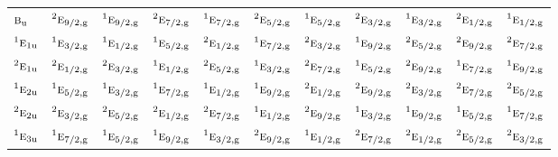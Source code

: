 \documentclass[10pt,a4paper]{article}
\numberwithin{equation}{section}
\newcommand{\irr}[1]{\text{\normalfont\scshape #1}}
\newcommand{\conjpair}[1]{{}^{#1}}
\newcommand{\ptag}[1]{\mathrm{#1}}
\begin{document}
{\begin{longtable}{@{}lcccccccccc@{}}
$\irr{b}_{\ptag{u}}$ & $\conjpair{2}\irr{e}_{9/2,\ptag{g}}$ & $\conjpair{1}\irr{e}_{9/2,\ptag{g}}$ & $\conjpair{2}\irr{e}_{7/2,\ptag{g}}$ & $\conjpair{1}\irr{e}_{7/2,\ptag{g}}$ & $\conjpair{2}\irr{e}_{5/2,\ptag{g}}$ & $\conjpair{1}\irr{e}_{5/2,\ptag{g}}$ & $\conjpair{2}\irr{e}_{3/2,\ptag{g}}$ & $\conjpair{1}\irr{e}_{3/2,\ptag{g}}$ & $\conjpair{2}\irr{e}_{1/2,\ptag{g}}$ & $\conjpair{1}\irr{e}_{1/2,\ptag{g}}$\\
$\conjpair{1}\irr{e}_{1\ptag{u}}$ & $\conjpair{1}\irr{e}_{3/2,\ptag{g}}$ & $\conjpair{1}\irr{e}_{1/2,\ptag{g}}$ & $\conjpair{1}\irr{e}_{5/2,\ptag{g}}$ & $\conjpair{2}\irr{e}_{1/2,\ptag{g}}$ & $\conjpair{1}\irr{e}_{7/2,\ptag{g}}$ & $\conjpair{2}\irr{e}_{3/2,\ptag{g}}$ & $\conjpair{1}\irr{e}_{9/2,\ptag{g}}$ & $\conjpair{2}\irr{e}_{5/2,\ptag{g}}$ & $\conjpair{2}\irr{e}_{9/2,\ptag{g}}$ & $\conjpair{2}\irr{e}_{7/2,\ptag{g}}$\\
$\conjpair{2}\irr{e}_{1\ptag{u}}$ & $\conjpair{2}\irr{e}_{1/2,\ptag{g}}$ & $\conjpair{2}\irr{e}_{3/2,\ptag{g}}$ & $\conjpair{1}\irr{e}_{1/2,\ptag{g}}$ & $\conjpair{2}\irr{e}_{5/2,\ptag{g}}$ & $\conjpair{1}\irr{e}_{3/2,\ptag{g}}$ & $\conjpair{2}\irr{e}_{7/2,\ptag{g}}$ & $\conjpair{1}\irr{e}_{5/2,\ptag{g}}$ & $\conjpair{2}\irr{e}_{9/2,\ptag{g}}$ & $\conjpair{1}\irr{e}_{7/2,\ptag{g}}$ & $\conjpair{1}\irr{e}_{9/2,\ptag{g}}$\\
$\conjpair{1}\irr{e}_{2\ptag{u}}$ & $\conjpair{1}\irr{e}_{5/2,\ptag{g}}$ & $\conjpair{1}\irr{e}_{3/2,\ptag{g}}$ & $\conjpair{1}\irr{e}_{7/2,\ptag{g}}$ & $\conjpair{1}\irr{e}_{1/2,\ptag{g}}$ & $\conjpair{1}\irr{e}_{9/2,\ptag{g}}$ & $\conjpair{2}\irr{e}_{1/2,\ptag{g}}$ & $\conjpair{2}\irr{e}_{9/2,\ptag{g}}$ & $\conjpair{2}\irr{e}_{3/2,\ptag{g}}$ & $\conjpair{2}\irr{e}_{7/2,\ptag{g}}$ & $\conjpair{2}\irr{e}_{5/2,\ptag{g}}$\\
$\conjpair{2}\irr{e}_{2\ptag{u}}$ & $\conjpair{2}\irr{e}_{3/2,\ptag{g}}$ & $\conjpair{2}\irr{e}_{5/2,\ptag{g}}$ & $\conjpair{2}\irr{e}_{1/2,\ptag{g}}$ & $\conjpair{2}\irr{e}_{7/2,\ptag{g}}$ & $\conjpair{1}\irr{e}_{1/2,\ptag{g}}$ & $\conjpair{2}\irr{e}_{9/2,\ptag{g}}$ & $\conjpair{1}\irr{e}_{3/2,\ptag{g}}$ & $\conjpair{1}\irr{e}_{9/2,\ptag{g}}$ & $\conjpair{1}\irr{e}_{5/2,\ptag{g}}$ & $\conjpair{1}\irr{e}_{7/2,\ptag{g}}$\\
$\conjpair{1}\irr{e}_{3\ptag{u}}$ & $\conjpair{1}\irr{e}_{7/2,\ptag{g}}$ & $\conjpair{1}\irr{e}_{5/2,\ptag{g}}$ & $\conjpair{1}\irr{e}_{9/2,\ptag{g}}$ & $\conjpair{1}\irr{e}_{3/2,\ptag{g}}$ & $\conjpair{2}\irr{e}_{9/2,\ptag{g}}$ & $\conjpair{1}\irr{e}_{1/2,\ptag{g}}$ & $\conjpair{2}\irr{e}_{7/2,\ptag{g}}$ & $\conjpair{2}\irr{e}_{1/2,\ptag{g}}$ & $\conjpair{2}\irr{e}_{5/2,\ptag{g}}$ & $\conjpair{2}\irr{e}_{3/2,\ptag{g}}$\\

\end{longtable}}
\end{document}
